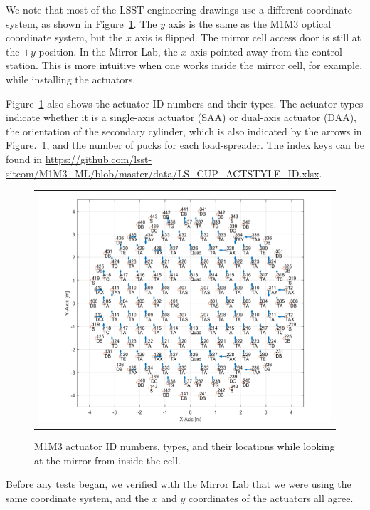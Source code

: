 \documentclass [twoside,openbib,12pt]{article}
\begin{document}
We note that most of the LSST engineering drawings use a different
coordinate system, as shown in Figure~\ref{fig:actMap}.
The $y$ axis is the same as the M1M3 optical coordinate system, but
the $x$ axis is flipped.
The mirror cell access door is still at the $+y$ position.
In the Mirror Lab, the $x$-axis pointed away from the control station.
This is more intuitive when one works inside the mirror cell, for
example, while installing the actuators.

Figure~\ref{fig:actMap} also shows the actuator
 ID numbers and their types.
The actuator types indicate whether it is a single-axis actuator (SAA)
or dual-axis actuator (DAA), the orientation of the secondary
cylinder, which is also indicated by the arrows in
Figure.~\ref{fig:actMap}, and the number of pucks for each
load-spreader.
The index keys can be found in \url{https://github.com/lsst-sitcom/M1M3_ML/blob/master/data/LS_CUP_ACTSTYLE_ID.xlsx}.

  \begin{figure}[bthp]
   \begin{center}
   \begin{tabular}{c}
\includegraphics[width=140mm]{figures/actMap.png}
  \end{tabular}
   \end{center}
   \caption
  { \label{fig:actMap}
M1M3 actuator ID numbers, types, and their locations while looking at the mirror from inside the cell.
 }
\end{figure}

Before any tests began, we verified with the Mirror Lab that we were
using the same coordinate system, and the $x$ and $y$ coordinates of
the actuators all agree.
\end{document}
